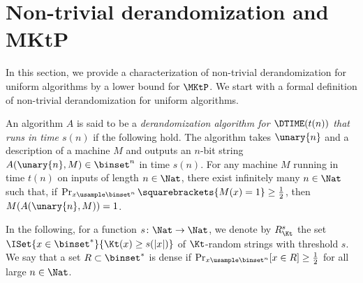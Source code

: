 \documentclass{toc}
\begin{document}
\section{Non-trivial derandomization and MKtP}

In this section, we provide a characterization of non-trivial derandomization for uniform algorithms by
a lower bound for $\MKtP$.
We start with a formal definition of non-trivial derandomization for uniform algorithms.
%

\begin{definition}
  An algorithm $A$ is said to be
  a \emph{derandomization algorithm for $\DTIME(t(n))$ that runs in time $s(n)$}
  if the following hold.
  The algorithm takes $\unary{n}$ and a description of a machine $M$ and outputs an $n$-bit string $A(\unary{n}, M) \in \binset^n$
  in time $s(n)$.
  For any machine $M$ running in time $t(n)$ on inputs of length $n \in \Nat$,
  there exist infinitely many $n \in \Nat$ such that,
  if $\Pr_{x \usample \binset^n} \squarebrackets{ M(x) = 1 } \ge \frac{1}{2}$,
  then $M(A(\unary{n}, M)) = 1$.
\end{definition}

In the following, for a function $s \colon \Nat \to \Nat$, we denote by $R_\Kt^s$ the set $\ISet{ x \in \binset^* }{ \Kt(x) \ge s(|x|) }$
of $\Kt$-random strings with threshold $s$.
We say that a set $R \subset \binset^*$ is dense if $\Pr_{x \usample \binset^n} [ x \in R ] \ge \frac{1}{2}$ for all large $n \in \Nat$.
\end{document}
